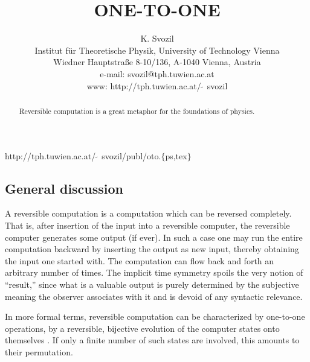 

 \def\Bbb{\bf }

\title{ONE-TO-ONE}
\author{K. Svozil\\
 {\small Institut f\"ur Theoretische Physik,}
  {\small University of Technology Vienna }     \\
  {\small Wiedner Hauptstra\ss e 8-10/136,}
  {\small A-1040 Vienna, Austria   }            \\
  {\small e-mail: svozil@tph.tuwien.ac.at}\\
  {\small www: http://tph.tuwien.ac.at/$\widetilde{\;\;}\,$svozil}}
\date{ }
\maketitle

\begin{flushright}
{\scriptsize http://tph.tuwien.ac.at/$\widetilde{\;\;}\,$svozil/publ/oto.$\{$ps,tex$\}$}
\end{flushright}

\begin{abstract}
Reversible computation is a great metaphor for the foundations of physics.
\end{abstract}

\subsection*{General discussion}
A reversible computation is a computation which can be reversed
completely.  That is,  after
insertion of the input into a reversible computer, the
reversible computer generates some output (if ever).
In such a case one may run the entire computation backward by inserting
the output as new input, thereby obtaining the input one started with.
The computation can flow back and forth an arbitrary number of times.
The implicit time symmetry spoils the very notion of
``result,'' since what is a valuable output is purely determined by the
subjective meaning the observer associates with it and is devoid of any
syntactic relevance.

 In more formal terms, reversible computation can be
 characterized by one-to-one operations, by a
reversible, bijective evolution of the computer states onto
themselves
\cite{landauer:61,bennett-73,fred-tof-82,bennett-82,landauer-94,maxwell-demon}.
If only a finite number of such states are involved, this
amounts to their permutation.

